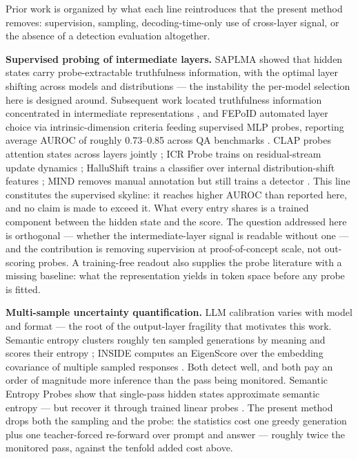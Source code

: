 
Prior work is organized by what each line reintroduces that the present method removes: supervision, sampling, decoding-time-only use of cross-layer signal, or the absence of a detection evaluation altogether.

\textbf{Supervised probing of intermediate layers.} SAPLMA showed that hidden states carry probe-extractable truthfulness information, with the optimal layer shifting across models and distributions \citep{Azaria2023} --- the instability the per-model selection here is designed around. Subsequent work located truthfulness information concentrated in intermediate representations \citep{Orgad2024}, and FEPoID automated layer choice via intrinsic-dimension criteria feeding supervised MLP probes, reporting average AUROC of roughly 0.73--0.85 across QA benchmarks \citep{Wang2026}. CLAP probes attention states across layers jointly \citep{Suresh2025}; ICR Probe trains on residual-stream update dynamics \citep{Zhang2025}; HalluShift trains a classifier over internal distribution-shift features \citep{Dasgupta2025}; MIND removes manual annotation but still trains a detector \citep{Su2024}. This line constitutes the supervised skyline: it reaches higher AUROC than reported here, and no claim is made to exceed it. What every entry shares is a trained component between the hidden state and the score. The question addressed here is orthogonal --- whether the intermediate-layer signal is readable without one --- and the contribution is removing supervision at proof-of-concept scale, not out-scoring probes. A training-free readout also supplies the probe literature with a missing baseline: what the representation yields in token space before any probe is fitted.

\textbf{Multi-sample uncertainty quantification.} LLM calibration varies with model and format \citep{Kadavath2022} --- the root of the output-layer fragility that motivates this work. Semantic entropy clusters roughly ten sampled generations by meaning and scores their entropy \citep{Farquhar2024}; INSIDE computes an EigenScore over the embedding covariance of multiple sampled responses \citep{Zhang2024SLED}. Both detect well, and both pay an order of magnitude more inference than the pass being monitored. Semantic Entropy Probes show that single-pass hidden states approximate semantic entropy --- but recover it through trained linear probes \citep{Kossen2024}. The present method drops both the sampling and the probe: the statistics cost one greedy generation plus one teacher-forced re-forward over prompt and answer --- roughly twice the monitored pass, against the tenfold added cost above.

